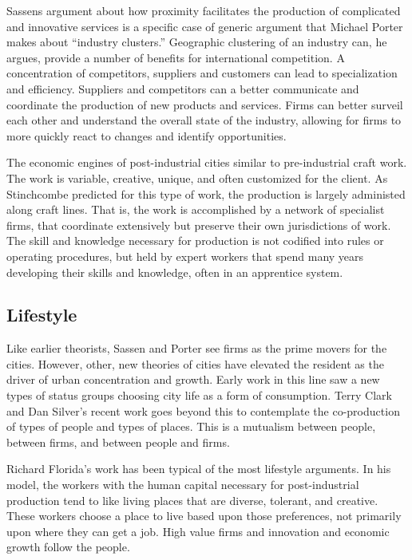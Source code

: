 Sassens argument about how proximity facilitates the production of
complicated and innovative services is a specific case of generic
argument that Michael Porter makes about ``industry clusters.''
Geographic clustering of an industry can, he argues, provide a number
of benefits for international competition. A concentration of
competitors, suppliers and customers can lead to specialization and
efficiency. Suppliers and competitors can a better 
communicate and coordinate the production of new products and
services. Firms can better surveil each
other and understand the overall state of the industry, allowing for
firms to more quickly react to changes and identify
opportunities.\cite{porter_competitive_1998}

The economic engines of post-industrial cities similar to
pre-industrial craft work. The work is variable, creative, unique, and
often customized for the client. As Stinchcombe predicted for this
type of work, the production is largely administed along craft
lines.\cite{stinchcombe_bureaucratic_1959} That is, the work is accomplished by a
network of specialist firms, that coordinate extensively but preserve
their own jurisdictions of work. The skill and knowledge necessary for
production is not codified into rules or operating procedures, but
held by expert workers that spend many years developing their skills
and knowledge, often in an apprentice system. 


\subsection*{Lifestyle}
Like earlier theorists, Sassen and Porter see firms as the prime
movers for the cities. However, other, new theories of cities have
elevated the resident as the driver of urban concentration and
growth. Early work in this line saw a new types of status groups
choosing city life as a form of consumption. Terry Clark and Dan
Silver's recent work goes beyond this to contemplate the co-production
of types of people and types of places. This is a mutualism between
people, between firms, and between people and firms.

Richard Florida's work has been typical of the most lifestyle
arguments. In his model, the workers with the human capital necessary
for post-industrial production tend to like living places that are
diverse, tolerant, and creative. These workers choose a place to live
based upon those preferences, not primarily upon where they can get a
job. High value firms and innovation and economic growth follow the
people.\cite{florida_rise_2014,clark_city_2011,berry_human_1974}

